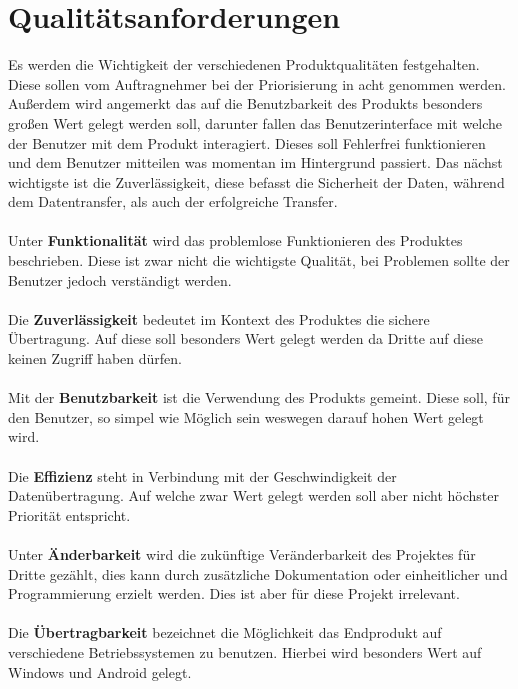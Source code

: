 \section{Qualitätsanforderungen}
Es werden die Wichtigkeit der verschiedenen Produktqualitäten festgehalten. Diese sollen vom Auftragnehmer bei der Priorisierung in acht genommen werden. 
Außerdem wird angemerkt das auf die Benutzbarkeit des Produkts besonders großen Wert gelegt werden soll, darunter fallen das Benutzerinterface mit welche der Benutzer mit dem Produkt interagiert. Dieses soll Fehlerfrei funktionieren und dem Benutzer mitteilen was momentan im Hintergrund passiert. Das nächst wichtigste ist die Zuverlässigkeit, diese befasst die Sicherheit der Daten, während dem Datentransfer, als auch der erfolgreiche Transfer.
\\\\
Unter \textbf{Funktionalität} wird das problemlose Funktionieren des Produktes beschrieben. Diese ist zwar nicht die wichtigste Qualität, bei Problemen sollte der Benutzer jedoch verständigt werden.
\\\\
Die \textbf{Zuverlässigkeit} bedeutet im Kontext des Produktes die sichere Übertragung. Auf diese soll besonders Wert gelegt werden da Dritte auf diese keinen Zugriff haben dürfen.
\\\\
Mit der \textbf{Benutzbarkeit} ist die Verwendung des Produkts gemeint. Diese soll, für den Benutzer, so simpel wie Möglich sein weswegen darauf hohen Wert gelegt wird.
\\\\
Die \textbf{Effizienz} steht in Verbindung mit der Geschwindigkeit der Datenübertragung. Auf welche zwar Wert gelegt werden soll aber nicht höchster Priorität entspricht.
\\\\
Unter \textbf{Änderbarkeit} wird die zukünftige Veränderbarkeit des Projektes für Dritte gezählt, dies kann durch zusätzliche Dokumentation oder einheitlicher und Programmierung erzielt werden. Dies ist aber für diese Projekt irrelevant.
\\\\
Die \textbf{Übertragbarkeit} bezeichnet die Möglichkeit das Endprodukt auf verschiedene Betriebssystemen zu benutzen. Hierbei wird besonders Wert auf Windows und Android gelegt. 

